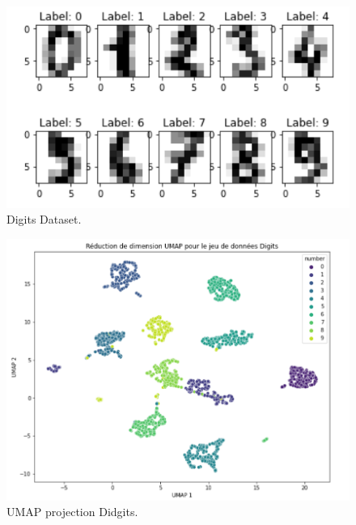 \documentclass{beamer}
\theoremstyle{definition}
\begin{document}
\begin{frame}
	\begin{minipage}[t]{1\linewidth}
	\begin{minipage}[t]{0.3\linewidth}\centering\begin{figure}
			\centering
			\includegraphics[scale=0.2]{digits.png}
			\caption*{Digits Dataset.}
	\end{figure}\end{minipage}\hfil 
	\begin{minipage}[t]{0.3\linewidth}\centering\begin{figure}
			\begin{center}
				\includegraphics[scale=0.12]{umap_digits.png}			
				\caption*{UMAP projection Didgits.}
			\end{center}
			

\end{figure}
\end{minipage}
\end{minipage}
\end{frame}
\end{document}
